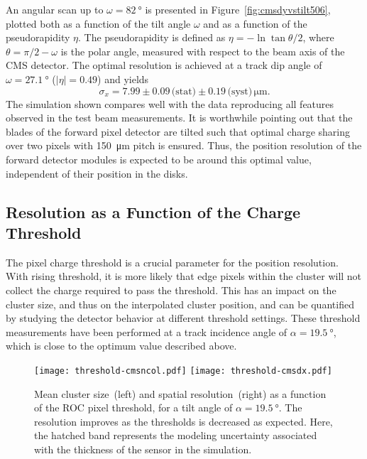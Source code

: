 \documentclass[a4paper,11pt]{article}
\newcommand{\SIERR}[4]{\ensuremath{\num{#1}\pm\num{#2}\,\text{(stat)}\pm\num{#3}\,\text{(syst)}\,\si{#4}}}
\begin{document}
An angular scan up to $\omega = \SI{82}{\degree}$ is presented in Figure~\ref{fig:cmsdyvstilt506}, plotted both as a function of the tilt angle $\omega$ and as a function of the pseudorapidity $\eta$.
The pseudorapidity is defined as $\eta = - \ln{\tan{\theta/2}}$, where $\theta = \pi/2 - \omega$ is the polar angle, measured with respect to the beam axis of the CMS detector.
The optimal resolution is achieved at a track dip angle of $\omega = \SI{27.1}{\degree}$ ($|\eta| = 0.49$) and yields
$$\sigma_x = \SIERR{7.99}{0.09}{0.19}{\micro\meter}\text{.}$$
The simulation shown compares well with the data reproducing all features observed in the test beam measurements.
It is worthwhile pointing out that the blades of the forward pixel detector are tilted such that optimal charge sharing over two pixels with \SI{150}{\um} pitch is ensured.
Thus, the position resolution of the forward detector modules is expected to be around this optimal value, independent of their position in the disks.

\subsection{Resolution as a Function of the Charge Threshold}
\label{sec:threshold}

The pixel charge threshold is a crucial parameter for the position resolution.
With rising threshold, it is more likely that edge pixels within the cluster will not collect the charge required to pass the threshold.
This has an impact on the cluster size, and thus on the interpolated cluster position, and can be quantified by studying the detector behavior at different threshold settings.
These threshold measurements have been performed at a track incidence angle of $\alpha = \SI{19.5}{\degree}$, which is close to the optimum value described above.


\begin{figure}
  \centering
  \texttt{[image: threshold-cmsncol.pdf]}%
  \texttt{[image: threshold-cmsdx.pdf]}
  \caption[Cluster size and spatial resolution as function of the pixel threshold]{Mean cluster size~(left) and spatial resolution~(right) as a function of the ROC pixel threshold, for a tilt angle of $\alpha = \SI{19.5}{\degree}$. The resolution improves as the thresholds is decreased as expected. Here, the hatched band represents the modeling uncertainty associated with the thickness of the sensor in the simulation.}
  \label{fig:threshold-resolution}
\end{figure}
\end{document}
